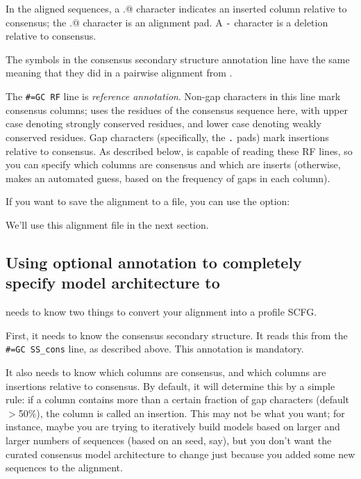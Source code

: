 In the aligned sequences, a \verb@.@ character indicates an inserted
column relative to consensus; the \verb@.@ character is an alignment
pad. A \verb+-+ character is a deletion relative to consensus.

The symbols in the consensus secondary structure annotation line have
the same meaning that they did in a pairwise alignment from
.

The {\small\verb+#=GC RF+} line is \emph{reference
annotation}. Non-gap characters in this line mark consensus columns;
 uses the residues of the consensus sequence here, with
upper case denoting strongly conserved residues, and lower case
denoting weakly conserved residues. Gap characters (specifically, the
\verb+.+ pads) mark insertions relative to consensus. As described
below,  is capable of reading these RF lines, so you can
specify which columns are consensus and which are inserts (otherwise,
 makes an automated guess, based on the frequency of
gaps in each column).

If you want to save the alignment to a file, you can use the 
option:


We'll use this  alignment file in the next section.

\subsection{Using optional annotation to completely specify model architecture
to }

 needs to know two things to convert your alignment into
a profile SCFG.

First, it needs to know the consensus secondary structure. It reads
this from the {\small\verb+#=GC SS_cons+} line, as described
above. This annotation is mandatory.

It also needs to know which columns are consensus, and which columns
are insertions relative to consensus. By default, it will determine
this by a simple rule: if a column contains more than a certain
fraction of gap characters (default $>$50\%), the column is called an
insertion. This may not be what you want; for instance, maybe you are
trying to iteratively build models based on larger and larger numbers
of sequences (based on an  seed, say), but you don't
want the curated consensus model architecture to change just because
you added some new sequences to the alignment.

